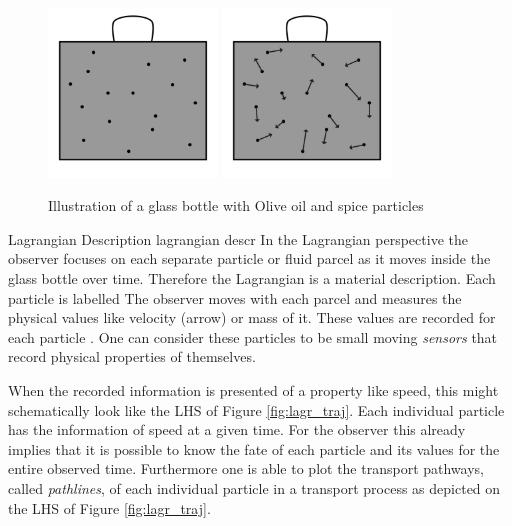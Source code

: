 \begin{figure}[htb]
\centering
\includegraphics[width=0.4\textwidth]{../figures/olive_oil_can_01.pdf}
\includegraphics[width=0.4\textwidth]{../figures/olive_oil_can_lagran.pdf}
\caption{Illustration of a glass bottle with Olive oil and spice particles}
\label{fig:Olive_bottle_plain}
\end{figure}

Lagrangian Description lagrangian descr
In the Lagrangian perspective the observer focuses on each separate particle or fluid parcel as it moves inside the glass bottle over time. Therefore the Lagrangian is a material description. Each particle is labelled 
The observer moves with each parcel and measures the physical values like velocity (arrow) or mass of it. These values are recorded for each particle 
. One can consider these particles to be small moving \emph{sensors} that record physical properties of themselves. 

When the recorded information is presented of a property like speed, this might schematically look like the LHS of Figure \ref{fig:lagr_traj}. Each individual particle has the information of speed at a given time. For the observer this already implies that it is possible to know the fate of each particle and its values for the entire observed time. Furthermore one is able to plot the transport pathways, called \emph{pathlines}, of each individual particle in a transport process as depicted on the LHS of Figure \ref{fig:lagr_traj}.

